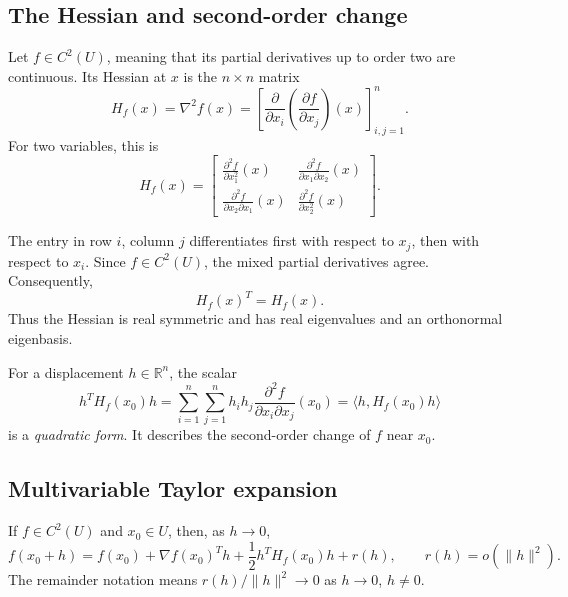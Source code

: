 \subsection{The Hessian and second-order change}
\begin{definition}
Let $f\in C^2(U)$, meaning that its partial derivatives up to order two are continuous. Its Hessian at $x$ is the $n\times n$ matrix
\begin{equation}
 H_f(x)=\nabla^2f(x)
 =\left[\frac{\partial}{\partial x_i}
       \left(\frac{\partial f}{\partial x_j}\right)(x)\right]_{i,j=1}^n.
 \label{eq:lec07-hessian}
\end{equation}
For two variables, this is
\[
 H_f(x)=\begin{bmatrix}
 \frac{\partial^2f}{\partial x_1^2}(x)&
 \frac{\partial^2f}{\partial x_1\partial x_2}(x)\\[5pt]
 \frac{\partial^2f}{\partial x_2\partial x_1}(x)&
 \frac{\partial^2f}{\partial x_2^2}(x)
 \end{bmatrix}.
\]
\end{definition}
The entry in row $i$, column $j$ differentiates first with respect to $x_j$, then with respect to $x_i$. Since $f\in C^2(U)$, the mixed partial derivatives agree. Consequently,
\[
 H_f(x)^T=H_f(x).
\]
Thus the Hessian is real symmetric and has real eigenvalues and an orthonormal eigenbasis.

For a displacement $h\in\mathbb{R}^n$, the scalar
\begin{equation}
 h^TH_f(x_0)h
 =\sum_{i=1}^n\sum_{j=1}^n h_i h_j
    \frac{\partial^2 f}{\partial x_i\partial x_j}(x_0)
 =\langle h,H_f(x_0)h\rangle
 \label{eq:lec07-quadratic}
\end{equation}
is a \emph{quadratic form}. It describes the second-order change of $f$ near $x_0$.

\subsection{Multivariable Taylor expansion}
\begin{theorem}
If $f\in C^2(U)$ and $x_0\in U$, then, as $h\to0$,
\begin{equation}
 f(x_0+h)=f(x_0)+\nabla f(x_0)^Th
       +\frac12 h^TH_f(x_0)h+r(h),
 \qquad r(h)=o(\|h\|^2).
 \label{eq:lec07-taylor}
\end{equation}
The remainder notation means $r(h)/\|h\|^2\to0$ as $h\to0$, $h\ne0$.
\end{theorem}

